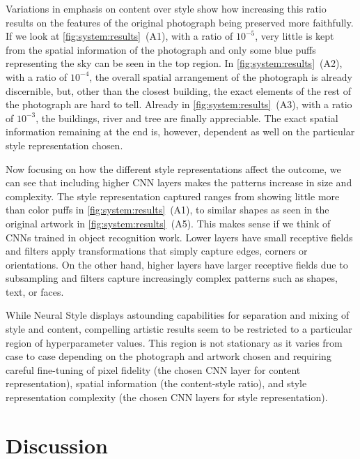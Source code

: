 Variations in emphasis on content over style show how increasing this ratio results on the features of the original photograph being preserved more faithfully.
If we look at \autoref{fig:system:results}~(A1), with a ratio of $10^{-5}$, very little is kept from the spatial information of the photograph and only some blue puffs representing the sky can be seen in the top region.
In \autoref{fig:system:results}~(A2), with a ratio of $10^{-4}$, the overall spatial arrangement of the photograph is already discernible, but, other than the closest building, the exact elements of the rest of the photograph are hard to tell.
Already in \autoref{fig:system:results}~(A3), with a ratio of $10^{-3}$, the buildings, river and tree are finally appreciable.
The exact spatial information remaining at the end is, however, dependent as well on the particular style representation chosen.

Now focusing on how the different style representations affect the outcome, we can see that including higher CNN layers makes the patterns increase in size and complexity.
The style representation captured ranges from showing little more than color puffs in \autoref{fig:system:results}~(A1), to similar shapes as seen in the original artwork in \autoref{fig:system:results}~(A5).
This makes sense if we think of CNNs trained in object recognition work.
Lower layers have small receptive fields and filters apply transformations that simply capture edges, corners or orientations.
On the other hand, higher layers have larger receptive fields due to subsampling and filters capture increasingly complex patterns such as shapes, text, or faces.

While Neural Style displays astounding capabilities for separation and mixing of style and content, compelling artistic results seem to be restricted to a particular region of hyperparameter values.
This region is not stationary as it varies from case to case depending on the photograph and artwork chosen and requiring careful fine-tuning of pixel fidelity (the chosen CNN layer for content representation), spatial information (the content-style ratio), and style representation complexity (the chosen CNN layers for style representation).



\section{Discussion}
\label{sec:system:discussion}

